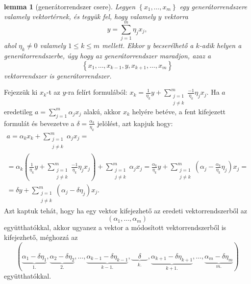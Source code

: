 \documentclass[a4paper, showtrims]{memoir}
\makeatletter
\renewenvironment{proof}[1][\proofname]
    {\par\pushQED{\qed}%
    \normalfont \topsep6\p@\@plus6\p@\relax
    \trivlist
    \item[\hskip\labelsep
        \itshape
    #1\@addpunct{:}]\ignorespaces}
    {\popQED\endtrivlist\@endpefalse}
\theoremstyle{plain}
\newtheorem{lemma}[proposition]{lemma}
\theoremstyle{remark}
\theoremstyle{definition}
\makeatother
\begin{document}
\begin{lemma}[generátorrendszer csere]\label{le:gencsere}
	Legyen $\left\{ x_1,\ldots,x_m \right\}$ egy generátorrendszere valamely vektortérnek,
	és tegyük fel, hogy valamely $y$ vektorra
	\[
		y=\sum_{j=1}^m\eta_jx_j,
	\]
	ahol $\eta_k\neq 0$ valamely $1\leq k\leq m$ mellett.
	Ekkor $y$ becserélhető a $k$-adik helyen a generátorrendszerbe,
	úgy hogy az generátorrendszer maradjon, azaz a
	\[
		\left\{ x_1,\ldots,x_{k-1},y,x_{k+1},\ldots,x_m \right\}
	\]
	vektorrendszer is generátorrendszer.
\end{lemma}
\begin{proof}
	Fejezzük ki $x_k$-t az $y$-ra felírt formulából:
	\(\displaystyle
	x_k=\frac{1}{\eta_k}y+\sum_{\substack{j=1\\j\neq k}}^m\frac{-1}{\eta_k}\eta_jx_j.
	\)
	Ha $a$ eredetileg
	\(\displaystyle
	a=\sum_{j=1}^m\alpha_jx_j
	\)
	alakú, akkor $x_k$ helyére betéve, a fent kifejezett formulát és bevezetve a
	$\delta=\frac{\alpha_k}{\eta_k}$ jelölést, azt kapjuk hogy:
	\begin{multline*}
		a=\alpha_kx_k+\sum_{\substack{j=1\\j\neq k}}^m\alpha_jx_j=
		\\
		=
		\alpha_k
		\left(
		\frac{1}{\eta_k}y+\sum_{\substack{j=1\\j\neq k}}^m\frac{-1}{\eta_k}\eta_jx_j
		\right)
		+\sum_{\substack{j=1\\j\neq k}}^m\alpha_jx_j
		=
		\frac{\alpha_k}{\eta_k}y+
		\sum_{\substack{j=1\\j\neq k}}^m\left( \alpha_j-\frac{\alpha_k}{\eta_k}\eta_j \right)x_j=
		\\
		=\delta y+
		\sum_{\substack{j=1\\j\neq k}}^m\left( \alpha_j-\delta\eta_j \right)x_j.
	\end{multline*}
	Azt kaptuk tehát, hogy ha egy vektor kifejezhető az eredeti vektorrendszerből az
	\[
		\left( \alpha_1,\ldots,\alpha_m \right)
	\]
	együtthatókkal, akkor ugyanez a vektor a módosított vektorrendszerből is kifejezhető,
	méghozzá az
	\[
		\left(
		\underbrace{\alpha_1-\delta\eta_1}_{1.},
		\underbrace{\alpha_2-\delta\eta_2}_{2.},
		\ldots,
		\underbrace{\alpha_{k-1}-\delta\eta_{k-1}}_{k-1.},
		\underbrace{\quad\delta\quad}_{k.},
		\underbrace{\alpha_{k+1}-\delta\eta_{k+1}}_{k+1.},
        \ldots,
		\underbrace{\alpha_m-\delta\eta_m}_{m.}
		\right)
	\]
	együtthatókkal.
\end{proof}
\end{document}
